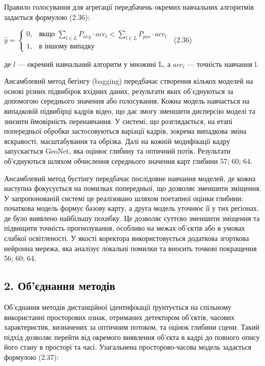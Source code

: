 \documentclass[
]{article}
\begin{document}
Правило голосування для агрегації передбачень окремих навчальних алгоритмів задається формулою (2.36):

\(\widehat{y} = \left\{ \begin{matrix}
{0,} & {\text{якщо~}\sum_{l \in L}^{}{P_{neg} \cdot acc_{l} < \sum_{l \in L}^{}{P_{pos} \cdot acc_{l}}}} \\
{1,} & \text{в~іншому~випадку}
\end{matrix} \right.\ \) (2.36)

де \(l\) --- окремий навчальний алгоритм у множині L, а \(acc_{l}\) --- точність навчання l.

Ансамблевий метод бегінгу (bagging) передбачає створення кількох моделей на основі різних підвибірок вхідних даних, результати яких об'єднуються за допомогою середнього значення або голосування. Кожна модель навчається на випадковій підвибірці кадрів відео, що дає змогу зменшити дисперсію моделі та знизити ймовірність перенавчання. У системі, що розглядається, на етапі попередньої обробки застосовуються варіації кадрів, зокрема випадкова зміна яскравості, масштабування та обрізка. Далі на кожній модифікації кадру запускається GeoNet, яка оцінює глибину та оптичний потік. Результати об'єднуються шляхом обчислення середнього значення карт глибини 57; 60; 64.

Ансамблевий метод бустінгу передбачає послідовне навчання моделей, де кожна наступна фокусується на помилках попередньої, що дозволяє зменшити зміщення. У запропонованій системі це реалізовано шляхом поетапної оцінки глибини: початкова модель формує базову карту, а друга модель уточнює її у тих регіонах, де було виявлено найбільшу похибку. Це дозволяє суттєво зменшити зміщення та підвищити точність прогнозування, особливо на межах об'єктів або в умовах слабкої освітленості. У якості коректора використовується додаткова згорткова нейронна мережа, яка аналізує локальні помилки та вносить точкові покращення 56; 60; 64.

\subsection{2. Об'єднання методів}\label{ux43eux431ux454ux434ux43dux430ux43dux43dux44f-ux43cux435ux442ux43eux434ux456ux432}

Об'єднання методів дистанційної ідентифікації ґрунтується на спільному використанні просторових ознак, отриманих детектором об'єктів, часових характеристик, визначених за оптичним потоком, та оцінок глибини сцени. Такий підхід дозволяє перейти від окремого виявлення об'єкта в кадрі до повного опису його стану в просторі та часі. Узагальнена просторово-часова модель задається формулою (2.37):
\end{document}
